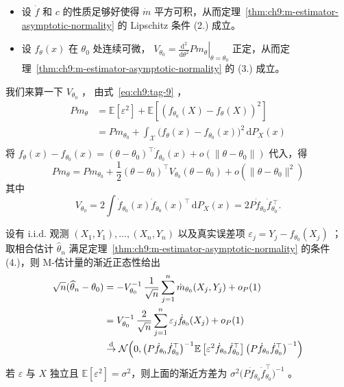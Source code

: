 \begin{example}[非线性最小二乘]
\begin{itemize}
\tightlist
\item
  设 $\dot f$ 和 $c$ 的性质足够好使得 $\dot m$ 平方可积，从而定理~\ref{thm:ch9:m-estimator-asymptotic-normality} 的 Lipschitz 条件 (2.) 成立。
\item
  设 $f_\theta(x)$ 在 $\theta_0$ 处连续可微， $V_{\theta_0}=\left.\frac{\mathrm{d}^2}{\mathrm{d}\theta^2}Pm_{\theta}\right|_{\theta=\theta_0}$ 正定，从而定理~\ref{thm:ch9:m-estimator-asymptotic-normality} 的 (3.) 成立。
\end{itemize}

我们来算一下 $V_{\theta_0}$ ， 由式~\eqref{eq:ch9:tag-9} ，\[\begin{aligned} P m_\theta &= \mathbb{E}[\varepsilon^2]+\mathbb{E}[(f_{\theta_0}(X)-f_\theta(X))^2]\\ &=P m_{\theta_0} + \int_{\mathscr X} \bigl(f_\theta(x)-f_{\theta_0}(x)\bigr)^2 \,\mathrm{d}P_X(x)\\  \end{aligned}\]
将 $f_\theta(x)-f_{\theta_0}(x) = (\theta-\theta_0)^\top\dot{f}\!_{\theta_0}(x) + o(\|\theta-\theta_0\|)$ 代入，得\[P m_\theta = P m_{\theta_0} + \frac{1}{2}(\theta-\theta_0)^\top V_{\theta_0}(\theta-\theta_0) + o(\|\theta-\theta_0\|^2)\]
其中
\[
V_{\theta_0} = 2\int \dot{f}\!_{\theta_0}(x)\dot{f}\!_{\theta_0}(x)^\top\,\mathrm{d}P_X(x) = 2P\dot{f}\!_{\theta_0}\dot{f}\!_{\theta_0}^{\ \top}.
\]

设有 i.i.d. 观测 $(X_1,Y_1),\dots,(X_n,Y_n)$ 以及真实误差项 $\varepsilon_j=Y_j-f_{\theta_0}(X_j)$ ；取相合估计 $\widehat\theta_n$ 满足定理~\ref{thm:ch9:m-estimator-asymptotic-normality} 的条件 (4.)，则 M-估计量的渐近正态性给出\[\begin{aligned} \sqrt{n}(\widehat{\theta}_n-\theta_0) &= -V_{\theta_0}^{-1}\,\frac{1}{\sqrt{n}}\sum_{j=1}^n \dot{m}_{\theta_0}(X_j,Y_j) + o_P(1)\\ &=V_{\theta_0}^{-1}\,\frac{2}{\sqrt{n}}\sum_{j=1}^n \varepsilon_j\dot{f}\!_{\theta_0}(X_j) + o_P(1)\\ &\overset{\rm d}\to\mathcal N\Big(0,\bigl(P\dot{f}_{\theta_0}\dot{f}_{\theta_0}^\top\bigr)^{-1} \mathbb{E}\left[\varepsilon^2\dot{f}_{\theta_0}\dot{f}_{\theta_0}^\top\right] \bigl(P\dot{f}_{\theta_0}\dot{f}_{\theta_0}^\top\bigr)^{-1}\Big) \end{aligned}\]
若 $\varepsilon$ 与 $X$ 独立且 $\mathbb{E}[\varepsilon^2]=\sigma^2$，则上面的渐近方差为 $\sigma^2 \bigl(P\dot{f}_{\theta_0}\dot{f}_{\theta_0}^\top\bigr)^{-1}$ 。


\end{example}

